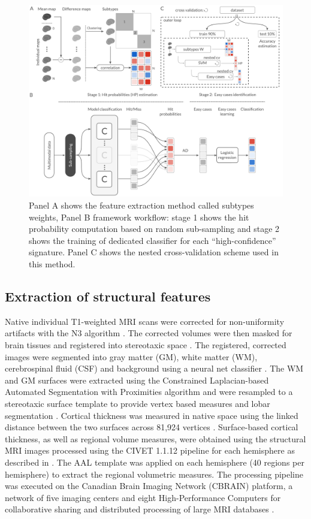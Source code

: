 \documentclass[authoryear]{elsarticle}
\begin{document}
\begin{figure}[htbp]
\centering
\includegraphics[width=\linewidth]{figures/methods.png}
\caption{Panel A shows the feature extraction method called subtypes weights, Panel B framework workflow: stage 1 shows the hit probability computation based on random sub-sampling and stage 2 shows the training of dedicated classifier for each ``high-confidence'' signature. Panel C shows the nested cross-validation scheme used in this method.}
\label{fig_methods}
\end{figure}

\subsection*{Extraction of structural features}
Native individual T1-weighted MRI scans were corrected for non-uniformity artifacts with the N3 algorithm \citep{Sled1998}. The corrected volumes were then masked for brain tissues \citep{Smith2002} and registered into stereotaxic space \citep{Collins1994}. The registered, corrected images were segmented into gray matter (GM), white matter (WM), cerebrospinal fluid (CSF) and background using a neural net classifier \citep{Tohka2004}. The WM and GM surfaces were extracted using the Constrained Laplacian-based Automated Segmentation with Proximities algorithm \citep{Kim2005,Macdonald2000} and were resampled to a stereotaxic surface template to provide vertex based measures and lobar segmentation \citep{Lyttelton2007}. Cortical thickness was measured in native space using the linked distance between the two surfaces across 81,924 vertices \citep{Im2008}. Surface-based cortical thickness, as well as regional volume measures,  were obtained using the structural MRI images processed using the CIVET 1.1.12 pipeline for each hemisphere as described in \cite{Ad-Dabbagh2006}. The AAL template was applied on each hemisphere (40 regions per hemisphere) to extract the regional volumetric measures. The processing pipeline was executed on the Canadian Brain Imaging Network (CBRAIN) platform, a network of five imaging centers and eight High-Performance Computers for collaborative sharing and distributed processing of large MRI databases \citep{Frisoni2011}.
\end{document}
